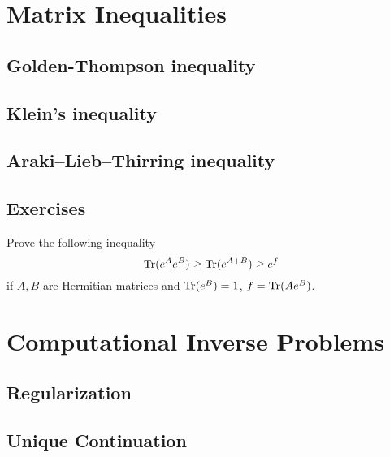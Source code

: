 \chapter{Matrix Inequalities}
\section{Golden-Thompson inequality}
\section{Klein's inequality}
\section{Araki–Lieb–Thirring inequality}
\section{Exercises}
\begin{problem}
Prove the following inequality 
    \begin{equation*}
        {\textrm{Tr}}(e^A e^B) \ge {\textrm{Tr}}(e^{A + B}) \ge e^f
    \end{equation*}
    if $A, B$ are Hermitian matrices and ${\textrm{Tr}}(e^B) = 1$, $f = {\textrm{Tr}}(A e^B)$.
\end{problem}
\newpage
\chapter{Computational Inverse Problems}
\section{Regularization}
\section{Unique Continuation}